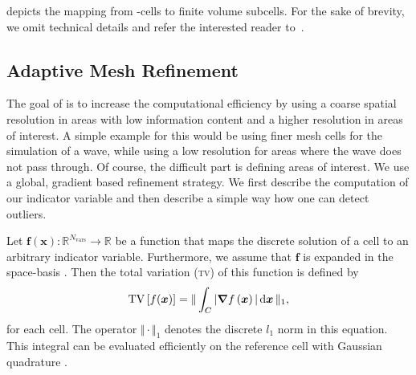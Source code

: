  depicts the mapping from \dg{}-cells to finite volume subcells.
For the sake of brevity, we omit technical details and refer the interested reader to~\cite{dumbser2016simple}.

\subsection{Adaptive Mesh Refinement}\label{sec:amr}
The goal of \amr{} is to increase the computational efficiency by using a coarse spatial resolution in areas with low information content and a higher resolution in areas of interest.
A simple example for this would be using finer mesh cells for the simulation of a wave, while using a low resolution for areas where the wave does not pass through.
Of course, the difficult part is defining areas of interest.
We use a global, gradient based refinement strategy.
We first describe the computation of our indicator variable and then describe a simple way how one can detect outliers.

Let $\bm{f}(\bm{x}): \mathbb{R}^{N_\text{vars}} \to \mathbb{R}$ be a function that maps the discrete solution of a cell to an arbitrary indicator variable.
Furthermore, we assume that $\bm{f}$ is expanded in the space-basis .
Then the total variation (\textsc{tv}) of this function is defined by
\newcommand{\tv}{\operatorname{TV}}
\begin{equation}
  \label{eq:tv}
  \tv \left[ f(\bm{x}) \right] =
  \Vert
\intdcell{ \vert \gradient{f \left( \bm{x} \right)} \vert }
\Vert_1
,
\end{equation}
for each cell.
The operator $\Vert \cdot \Vert_1$ denotes the discrete $l_1$ norm in this equation.
This integral can be evaluated efficiently on the reference cell  with Gaussian quadrature .

